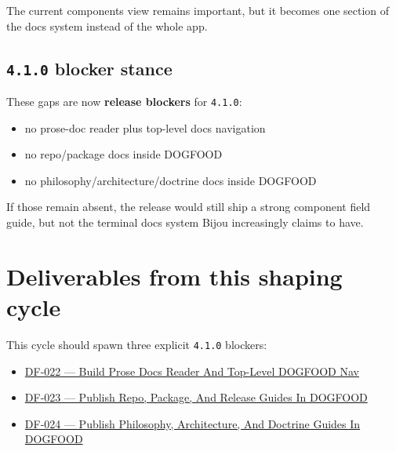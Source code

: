 The current components view remains important, but it becomes one section of the docs system instead of the whole app.

\subsection{\texorpdfstring{\texttt{4\allowbreak{}.\allowbreak{}1\allowbreak{}.\allowbreak{}0} blocker stance}{ blocker stance}}\label{record-082-blocker-stance}

These gaps are now \textbf{release blockers} for \texttt{4\allowbreak{}.\allowbreak{}1\allowbreak{}.\allowbreak{}0}:

\begin{itemize}
\tightlist
\item
  no prose-doc reader plus top-level docs navigation
\item
  no repo/package docs inside DOGFOOD
\item
  no philosophy/architecture/doctrine docs inside DOGFOOD
\end{itemize}

If those remain absent, the release would still ship a strong component field guide, but not the terminal docs system Bijou increasingly claims to have.

\section{Deliverables from this shaping cycle}\label{record-082-deliverables-from-this-shaping-cycle}

This cycle should spawn three explicit \texttt{4\allowbreak{}.\allowbreak{}1\allowbreak{}.\allowbreak{}0} blockers:

\begin{itemize}
\tightlist
\item
  \href{https://github.com/flyingrobots/bijou/blob/cbd70612140e7a450d764b3c7be1c6af878b99bc/docs/design/DF-022-build-prose-docs-reader-and-top-level-dogfood-nav.md}{DF-022 --- Build Prose Docs Reader And Top-Level DOGFOOD Nav}
\item
  \href{https://github.com/flyingrobots/bijou/blob/cbd70612140e7a450d764b3c7be1c6af878b99bc/docs/design/DF-023-publish-repo-package-and-release-guides-in-dogfood.md}{DF-023 --- Publish Repo, Package, And Release Guides In DOGFOOD}
\item
  \href{https://github.com/flyingrobots/bijou/blob/cbd70612140e7a450d764b3c7be1c6af878b99bc/docs/design/DF-024-publish-philosophy-architecture-and-doctrine-guides-in-dogfood.md}{DF-024 --- Publish Philosophy, Architecture, And Doctrine Guides In DOGFOOD}
\end{itemize}

